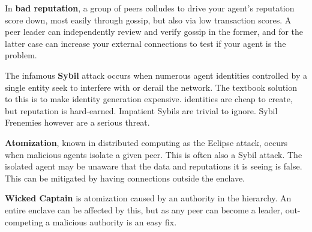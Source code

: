 In \textbf{bad reputation}, a group of peers colludes to drive your agent's reputation score down, most easily through gossip, but also via low transaction scores.
A peer leader can independently review and verify gossip in the former, and for the latter case can increase your external connections to test if your agent is the problem.

The infamous \textbf{Sybil} attack occurs when numerous agent identities controlled by a single entity seek to interfere with or derail the network.
The textbook solution to this is to make identity generation expensive. \projectName identities are cheap to create, but reputation is hard-earned.
Impatient Sybils are trivial to ignore.
Sybil Frenemies however are a serious threat.

\textbf{Atomization}, known in distributed computing as the Eclipse attack, occurs when malicious agents isolate a given peer.
This is often also a Sybil attack.
The isolated agent may be unaware that the data and reputations it is seeing is false.
This can be mitigated by having connections outside the enclave.

\textbf{Wicked Captain} is atomization caused by an authority in the hierarchy.
An entire enclave can be affected by this, but as any peer can become a leader, out-competing a malicious authority is an easy fix.